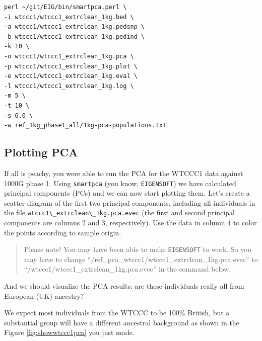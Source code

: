 \documentclass[
]{book}
\newcommand{\passthrough}[1]{#1}
\begin{document}
\begin{lstlisting}
perl ~/git/EIG/bin/smartpca.perl \
-i wtccc1/wtccc1_extrclean_1kg.bed \
-a wtccc1/wtccc1_extrclean_1kg.pedsnp \
-b wtccc1/wtccc1_extrclean_1kg.pedind \
-k 10 \
-o wtccc1/wtccc1_extrclean_1kg.pca \
-p wtccc1/wtccc1_extrclean_1kg.plot \
-e wtccc1/wtccc1_extrclean_1kg.eval \
-l wtccc1/wtccc1_extrclean_1kg.log \
-m 5 \
-t 10 \
-s 6.0 \
-w ref_1kg_phase1_all/1kg-pca-populations.txt
\end{lstlisting}

\hypertarget{plotting-pca}{%
\subsection{Plotting PCA}\label{plotting-pca}}

If all is peachy, you were able to run the PCA for the WTCCC1 data against 1000G phase 1. Using \passthrough{\lstinline!smartpca!} (you know, \passthrough{\lstinline!EIGENSOFT!}) we have calculated principal components (PCs) and we can now start plotting them. Let's create a scatter diagram of the first two principal components, including all individuals in the file \passthrough{\lstinline!wtccc1\_extrclean\_1kg.pca.evec!} (the first and second principal components are columns 2 and 3, respectively). Use the data in column 4 to color the points according to sample origin.

\begin{quote}
Please note! You may have been able to make \passthrough{\lstinline!EIGENSOFT!} to work. So you may have to change ``/ref\_pca\_wtccc1/wtccc1\_extrclean\_1kg.pca.evec'' to ``/wtccc1/wtccc1\_extrclean\_1kg.pca.evec'' in the command below.
\end{quote}

And we should visualize the PCA results: are these individuals really all from European (UK) ancestry?

We expect most individuals from the WTCCC to be 100\% British, but a substantial group will have a different ancestral background as shown in the Figure \ref{fig:showwtccc1pca} you just made.
\end{document}
